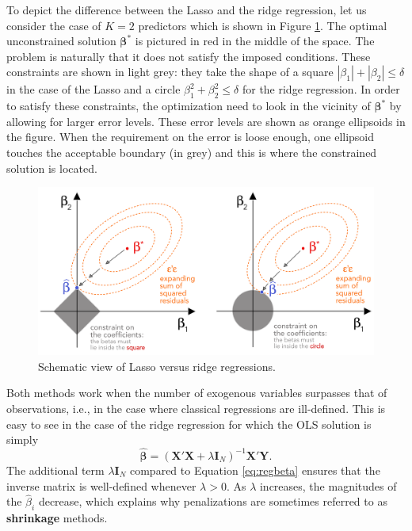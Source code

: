 \documentclass[]{krantz}
\theoremstyle{definition}
\theoremstyle{definition}
\theoremstyle{definition}
\theoremstyle{remark}
\begin{document}
To depict the difference between the Lasso and the ridge regression, let
us consider the case of \(K=2\) predictors which is shown in Figure
\ref{fig:lassoridge}. The optimal unconstrained solution
\(\boldsymbol{\beta}^*\) is pictured in red in the middle of the space.
The problem is naturally that it does not satisfy the imposed
conditions. These constraints are shown in light grey: they take the
shape of a square \(|\beta_1|+|\beta_2| \le \delta\) in the case of the
Lasso and a circle \(\beta_1^2+\beta_2^2 \le \delta\) for the ridge
regression. In order to satisfy these constraints, the optimization need
to look in the vicinity of \(\boldsymbol{\beta}^*\) by allowing for
larger error levels. These error levels are shown as orange ellipsoids
in the figure. When the requirement on the error is loose enough, one
ellipsoid touches the acceptable boundary (in grey) and this is where
the constrained solution is located.

\begin{figure}[H]

{\centering \includegraphics[width=800px]{images/lassoridge} 

}

\caption{Schematic view of Lasso versus ridge regressions.}\label{fig:lassoridge}
\end{figure}

Both methods work when the number of exogenous variables surpasses that
of observations, i.e., in the case where classical regressions are
ill-defined. This is easy to see in the case of the ridge regression for
which the OLS solution is simply
\[\hat{\boldsymbol{\beta}}=(\mathbf{X}'\mathbf{X}+\lambda \mathbf{I}_N)^{-1}\mathbf{X}'\mathbf{Y}.\]
The additional term \(\lambda \mathbf{I}_N\) compared to Equation
\eqref{eq:regbeta} ensures that the inverse matrix is well-defined
whenever \(\lambda>0\). As \(\lambda\) increases, the magnitudes of the
\(\hat{\beta}_i\) decrease, which explains why penalizations are
sometimes referred to as \textbf{shrinkage} methods.
\end{document}
